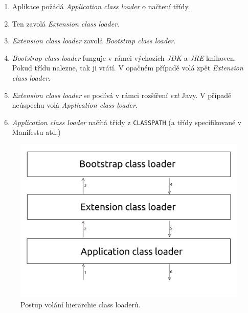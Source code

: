 \begin{enumerate}
	\item Aplikace požádá \textit{Application class loader} o načtení třídy.
	\item Ten zavolá \textit{Extension class loader}.
	\item \textit{Extension class loader} zavolá \textit{Bootstrap class loader}.
	\item \textit{Bootstrap class loader} funguje v rámci výchozích \textit{JDK} a \textit{JRE} knihoven. Pokud třídu nalezne, tak ji vrátí. V opačném případě volá zpět \textit{Extension class loader}.
	\item \textit{Extension class loader} se podívá v rámci rozšíření \textit{ext} Javy. V případě neúspechu volá \textit{Application class loader}.
	\item \textit{Application class loader} načítá třídy z \texttt{CLASSPATH} (a třídy specifikované v Manifestu atd.)
\end{enumerate}

\begin{figure}[ht!]
	\centering
	\includegraphics[scale=0.32]{obrazky/class-loader.png}
	\caption{Postup volání hierarchie class loaderů.}
	\label{obr-class-loader}
\end{figure}






